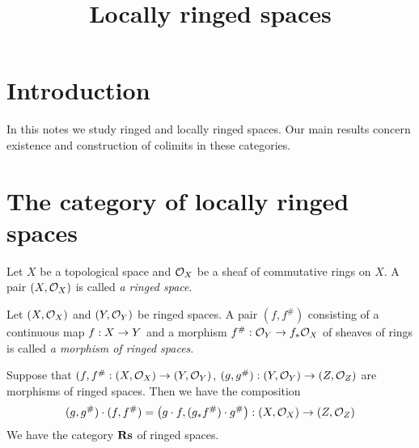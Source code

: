 



\title{Locally ringed spaces}
\date{}
\maketitle

\section{Introduction}
In this notes we study ringed and locally ringed spaces. Our main results concern existence and construction of colimits in these categories.

\section{The category of locally ringed spaces}

\begin{definition}
Let $X$ be a topological space and ${\mathcal O}_X$ be a sheaf of commutative rings on $X$. A pair $(X,{\mathcal O}_X)$ is called \textit{a ringed space}.
\end{definition}

\begin{definition}
Let $(X,{\mathcal O}_X)$ and $(Y,{\mathcal O}_Y)$ be ringed spaces. A pair $(f,f^{\#})$ consisting of a continuous map $f:X\rightarrow Y$ and a morphism $f^{\#}:{\mathcal O}_Y\rightarrow f_*{\mathcal O}_X$ of sheaves of rings is called \textit{a morphism of ringed spaces}.
\end{definition}
\noindent
Suppose that $(f,f^{\#}:(X,{\mathcal O}_X)\rightarrow (Y,{\mathcal O}_Y)$, $(g,g^{\#}):(Y,{\mathcal O}_Y)\rightarrow (Z,{\mathcal O}_Z)$ are morphisms of ringed spaces. Then we have the composition
$$(g,g^{\#})\cdot (f,f^{\#}) = \left(g\cdot f,(g_*f^{\#})\cdot g^{\#}\right):(X,{\mathcal O}_X)\rightarrow (Z,{\mathcal O}_Z)$$
We have the category $\mathbf{Rs}$ of ringed spaces.

